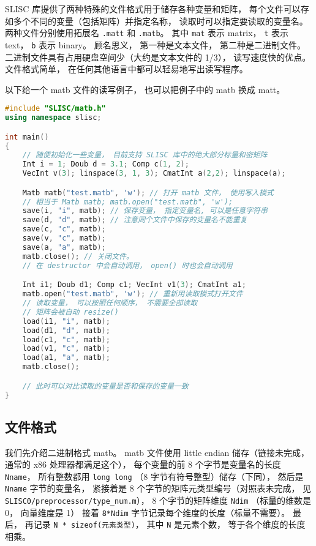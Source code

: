 
\begin{issues}
\issueTODO
\end{issues}


SLISC 库提供了两种特殊的文件格式用于储存各种变量和矩阵， 每个文件可以存如多个不同的变量（包括矩阵）并指定名称， 读取时可以指定要读取的变量名。 两种文件分别使用拓展名 \verb|.matt| 和 \verb|.matb|。 其中 \verb|mat| 表示 matrix， \verb|t| 表示 text， \verb|b| 表示 binary。 顾名思义， 第一种是文本文件， 第二种是二进制文件。 二进制文件具有占用硬盘空间少（大约是文本文件的 1/3）， 读写速度快的优点。 文件格式简单， 在任何其他语言中都可以轻易地写出读写程序。

以下给一个 matb 文件的读写例子， 也可以把例子中的 matb 换成 matt。

\begin{lstlisting}[language=cpp]
#include "SLISC/matb.h"
using namespace slisc;

int main()
{
    // 随便初始化一些变量， 目前支持 SLISC 库中的绝大部分标量和密矩阵
    Int i = 1; Doub d = 3.1; Comp c(1, 2);
    VecInt v(3); linspace(3, 1, 3); CmatInt a(2,2); linspace(a);

    Matb matb("test.matb", 'w'); // 打开 matb 文件， 使用写入模式
    // 相当于 Matb matb; matb.open("test.matb", 'w');
    save(i, "i", matb); // 保存变量， 指定变量名, 可以是任意字符串
    save(d, "d", matb); // 注意同个文件中保存的变量名不能重复
    save(c, "c", matb);
    save(v, "c", matb);
    save(a, "a", matb);
    matb.close(); // 关闭文件。
    // 在 destructor 中会自动调用， open() 时也会自动调用

    Int i1; Doub d1; Comp c1; VecInt v1(3); CmatInt a1;
    matb.open("test.matb", 'w'); // 重新用读取模式打开文件
    // 读取变量， 可以按照任何顺序， 不需要全部读取
    // 矩阵会被自动 resize()
    load(i1, "i", matb); 
    load(d1, "d", matb);
    load(c1, "c", matb);
    load(v1, "c", matb);
    load(a1, "a", matb);
    matb.close();

    // 此时可以对比读取的变量是否和保存的变量一致
}
\end{lstlisting}

\subsection{文件格式}
我们先介绍二进制格式 matb。 matb 文件使用 little endian 储存（链接未完成， 通常的 x86 处理器都满足这个）， 每个变量的前 8 个字节是变量名的长度 \verb|Nname|， 所有整数都用 \verb|long long| （8 字节有符号整型）储存（下同）， 然后是 \verb|Nname| 字节的变量名， 紧接着是 8 个字节的矩阵元类型编号（对照表未完成， 见 \verb|SLISC0/preprocessor/type_num.m|）， 8 个字节的矩阵维度 \verb|Ndim| （标量的维数是 0， 向量维度是 1） 接着 \verb|8*Ndim| 字节记录每个维度的长度（标量不需要）。 最后， 再记录 \verb|N * sizeof(元素类型)|， 其中 \verb|N| 是元素个数， 等于各个维度的长度相乘。

